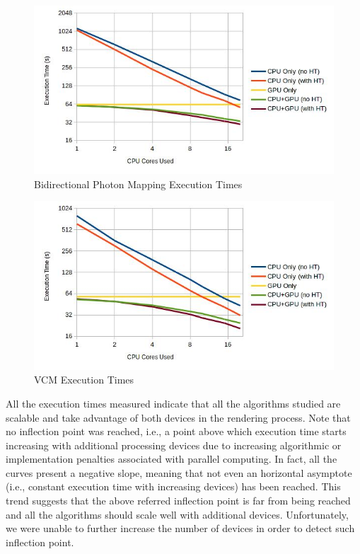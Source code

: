 \begin{figure}[H]
\centering
\includegraphics[width=0.8\linewidth]{img/bpmTexec.jpg}
\caption{\label{img:bpmTexec} Bidirectional Photon Mapping Execution Times}
\end{figure}

\begin{figure}[H]
\centering
\includegraphics[width=0.8\linewidth]{img/vcmTexec.jpg}
\caption{\label{img:vcmTexec} VCM Execution Times}
\end{figure}

All the execution times measured indicate that all the algorithms studied are scalable and take advantage of both devices in the rendering process. Note that no inflection point was reached, i.e., a point above which execution time starts increasing with additional processing devices due to increasing algorithmic or implementation penalties associated with parallel computing. In fact, all the curves present a negative slope, meaning that not even an horizontal asymptote (i.e., constant execution time with increasing devices) has been reached. This trend suggests that the above referred inflection point is far from being reached and all the algorithms should scale well with additional devices. Unfortunately, we were unable to further increase the number of devices in order to detect such inflection point.

